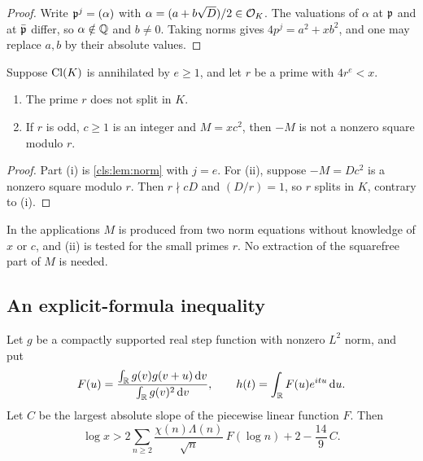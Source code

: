 \begin{proof}
Write $\mathfrak p^j=(\alpha)$ with $\alpha=(a+b\sqrt D)/2\in\mathcal{O}_K$. The valuations of $\alpha$
at $\mathfrak p$ and at $\bar{\mathfrak p}$ differ, so $\alpha\notin\mathbb{Q}$ and $b\ne0$. Taking norms gives
$4p^j=a^2+xb^2$, and one may replace $a,b$ by their absolute values.
\end{proof}

\begin{corollary}\label{cls:cor:witness}
Suppose $\operatorname{Cl}(K)$ is annihilated by $e\ge1$, and let $r$ be a prime with $4r^e<x$.
\begin{enumerate}[label=\textup{(\roman*)}]
\item The prime $r$ does not split in $K$.
\item If $r$ is odd, $c\ge1$ is an integer and $M=xc^2$, then $-M$ is not a nonzero
square modulo $r$.
\end{enumerate}
\end{corollary}

\begin{proof}
Part (i) is \cref{cls:lem:norm} with $j=e$. For (ii), suppose $-M=Dc^2$ is a nonzero
square modulo $r$. Then $r\nmid cD$ and $(D/r)=1$, so $r$ splits in $K$, contrary to (i).
\end{proof}

In the applications $M$ is produced from two norm equations without knowledge of $x$ or
$c$, and (ii) is tested for the small primes $r$. No extraction of the squarefree part of
$M$ is needed.

\subsection{An explicit-formula inequality}\label{cls:sec:weil}

\begin{proposition}\label{cls:prop:weil}
Let $g$ be a compactly supported real step function with nonzero $L^2$ norm, and put
\[
 F(u)=\frac{\int_{\mathbb{R}}g(v)g(v+u)\,\mathrm{d} v}{\int_{\mathbb{R}}g(v)^2\,\mathrm{d} v},
 \qquad h(t)=\int_{\mathbb{R}}F(u)e^{itu}\,\mathrm{d} u .
\]
Let $C$ be the largest absolute slope of the piecewise linear function $F$. Then
\begin{equation}\label{cls:eq:weil}
 \log x>2\sum_{n\ge2}\frac{\chi(n)\Lambda(n)}{\sqrt n}\,F(\log n)+2-\frac{14}{9}\,C .
\end{equation}
\end{proposition}

